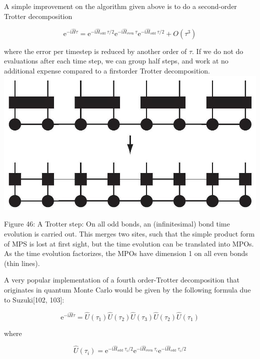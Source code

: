 \documentclass[12pt]{article}
\begin{document}
A simple improvement on the algorithm given above is to do a second-order Trotter decomposition


\begin{equation*}
\mathrm{e}^{-\mathrm{i} \hat{H} \tau}=\mathrm{e}^{-\mathrm{i} \hat{H}_{\text {odd }} \tau / 2} \mathrm{e}^{-\mathrm{i} \hat{H}_{\text {even }} \tau} \mathrm{e}^{-\mathrm{i} \hat{H}_{\text {odd }} \tau / 2}+O\left(\tau^{3}\right) \tag{229}
\end{equation*}


where the error per timestep is reduced by another order of $\tau$. If we do not do evaluations after each time step, we can group half steps, and work at no additional expense compared to a firstorder Trotter decomposition.\\
\includegraphics[max width=\textwidth, center]{2024_05_04_afc4ad226da9ccfe0ac8g-077}

Figure 46: A Trotter step: On all odd bonds, an (infinitesimal) bond time evolution is carried out. This merges two sites, such that the simple product form of MPS is lost at first sight, but the time evolution can be translated into MPOs. As the time evolution factorizes, the MPOs have dimension 1 on all even bonds (thin lines).

A very popular implementation of a fourth order-Trotter decomposition that originates in quantum Monte Carlo would be given by the following formula due to Suzuki[102, 103]:


\begin{equation*}
\mathrm{e}^{-\mathrm{i} \hat{H} \tau}=\hat{U}\left(\tau_{1}\right) \hat{U}\left(\tau_{2}\right) \hat{U}\left(\tau_{3}\right) \hat{U}\left(\tau_{2}\right) \hat{U}\left(\tau_{1}\right) \tag{230}
\end{equation*}


where


\begin{equation*}
\hat{U}\left(\tau_{i}\right)=\mathrm{e}^{-\mathrm{i} \hat{H}_{\text {odd }} \tau_{i} / 2} \mathrm{e}^{-\mathrm{i} \hat{H}_{\text {even }} \tau_{i}} \mathrm{e}^{-\mathrm{i} \hat{H}_{\text {odd }} \tau_{i} / 2} \tag{231}
\end{equation*}
\end{document}
